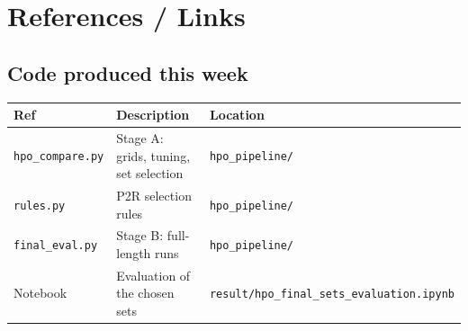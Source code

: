 \section{References / Links}

\subsection*{Code produced this week}
\begin{table}[H]
\centering
\small
\begin{tabularx}{\textwidth}{@{}l L l@{}}
\toprule
\textbf{Ref} & \textbf{Description} & \textbf{Location} \\
\midrule
\texttt{hpo\_compare.py} & Stage A: grids, tuning, set selection & \texttt{hpo\_pipeline/} \\
\texttt{rules.py} & P2R selection rules & \texttt{hpo\_pipeline/} \\
\texttt{final\_eval.py} & Stage B: full-length runs & \texttt{hpo\_pipeline/} \\
Notebook & Evaluation of the chosen sets & \texttt{result/hpo\_final\_sets\_evaluation.ipynb} \\
\bottomrule
\end{tabularx}
\end{table}

